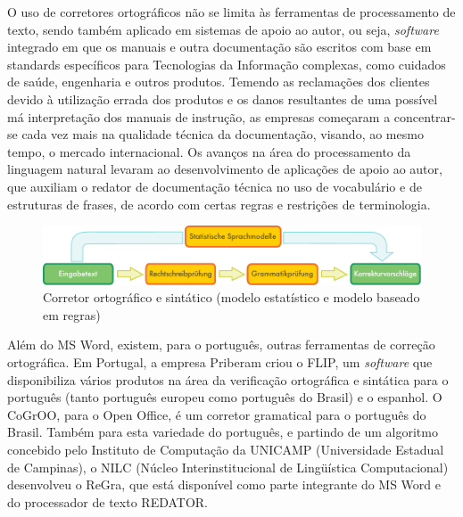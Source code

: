 \documentclass[]{../metanetpaper}
\begin{document}
\begin{multicols}{2}

O uso de corretores ortográficos não se limita às ferramentas de processamento de texto, sendo também aplicado em sistemas de apoio ao autor, ou seja, \textit{software} integrado em que os manuais e outra documentação são escritos com base em standards específicos para Tecnologias da Informação complexas, como cuidados de saúde, engenharia e outros produtos. Temendo as reclamações dos clientes devido à utilização errada dos produtos e os danos resultantes de uma possível má interpretação dos manuais de instrução, as empresas começaram a concentrar-se cada vez mais na qualidade técnica da documentação, visando, ao mesmo tempo, o mercado internacional. Os avanços na área do processamento da linguagem natural levaram ao desenvolvimento de aplicações de apoio ao autor, que auxiliam o redator de documentação técnica no uso de vocabulário e de estruturas de frases, de acordo com certas regras e restrições de terminologia.

\begin{figure}[htb]
  \center
  \includegraphics[width=\textwidth]{../_media/german/language_checking}
  \caption{Corretor ortográfico e sintático (modelo estatístico e modelo baseado em regras)}
  \label{fig:langcheckingaarch_de}
\end{figure}

Além do MS Word, existem, para o português, ou\-tras ferramentas de correção ortográfica. Em Portugal, a empresa Priberam criou o FLIP, um \textit{software} que disponibiliza vários produtos na área da verificação ortográfica e sintática para o português (tanto português europeu como português do Brasil) e o espanhol. O CoGrOO, para o Open Office, é um corretor gramatical para o português do Brasil. Também para esta variedade do português, e partindo de um algoritmo concebido pelo Instituto de Computação da UNICAMP (Universidade Estadual de Campinas), o NILC (Núcleo Interinstitucional de Lingüística Computacional) desenvolveu o ReGra, que está disponível como parte integrante do MS Word e do processador de texto REDATOR.


\end{multicols}
\end{document}
